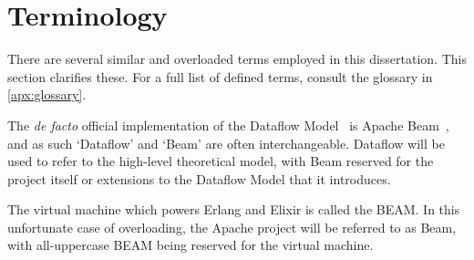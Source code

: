 \section{Terminology}\label{sec:intro:terminology}

There are several similar and overloaded terms employed in this dissertation.
This section clarifies these.
For a full list of defined terms, consult the glossary in \cref{apx:glossary}.

The \emph{de facto} official implementation of the Dataflow Model~\cite{Akidau:2015} is Apache Beam~\cite{ApacheBeam}, and as such `Dataflow' and `Beam' are often interchangeable.
Dataflow will be used to refer to the high-level theoretical model, with Beam reserved for the project itself or extensions to the Dataflow Model that it introduces.

The virtual machine which powers Erlang and Elixir is called the BEAM.
In this unfortunate case of overloading, the Apache project will be referred to as Beam, with all-uppercase BEAM being reserved for the virtual machine.
